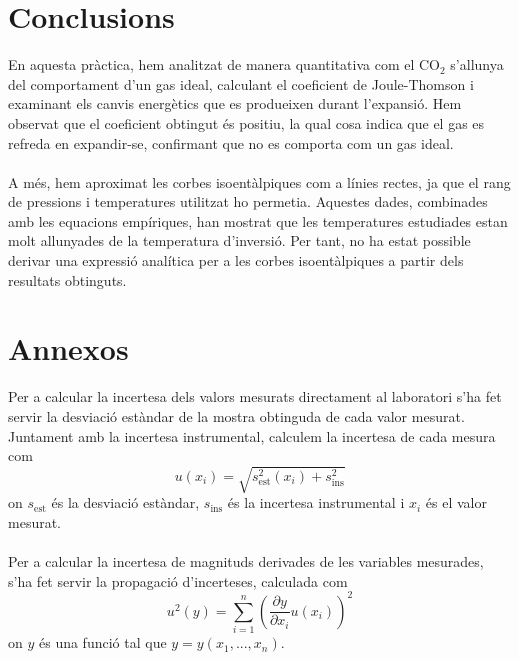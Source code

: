 \documentclass[12pt,twosides,onecolumn,openany]{article}
\begin{document}
\section{Conclusions}
En aquesta pràctica, hem analitzat de manera quantitativa com el CO$_2$ s'allunya del comportament d'un gas ideal, calculant el coeficient de Joule-Thomson i examinant els canvis energètics que es produeixen durant l'expansió. Hem observat que el coeficient obtingut és positiu, la qual cosa indica que el gas es refreda en expandir-se, confirmant que no es comporta com un gas ideal.\\\\
A més, hem aproximat les corbes isoentàlpiques com a línies rectes, ja que el rang de pressions i temperatures utilitzat ho permetia. Aquestes dades, combinades amb les equacions empíriques, han mostrat que les temperatures estudiades estan molt allunyades de la temperatura d'inversió. Per tant, no ha estat possible derivar una expressió analítica per a les corbes isoentàlpiques a partir dels resultats obtinguts.
\section{Annexos}
Per a calcular la incertesa dels valors mesurats directament al laboratori s'ha fet servir la desviació estàndar de la mostra obtinguda de cada valor mesurat. Juntament amb la incertesa instrumental, calculem la incertesa de cada mesura com
\begin{equation*}
        u(x_i) = \sqrt{ s_{\text{est}}^2(x_i) + s_{\text{ins}}^2}
\end{equation*}
on $s_{\text{est}}$ és la desviació estàndar, $s_{\text{ins}}$ és la incertesa instrumental i $x_i$ és el valor mesurat.\\\\
Per a calcular la incertesa de magnituds derivades de les variables mesurades, s'ha fet servir la propagació d'incerteses, calculada com
\begin{equation*}
    u^2(y) = \sum_{i = 1}^{n} \left( \frac{\partial y}{\partial{x_i}} u(x_i)\right)^2
\end{equation*}
on $y$ és una funció tal que $y = y(x_1,...,x_n)$.
\end{document}
